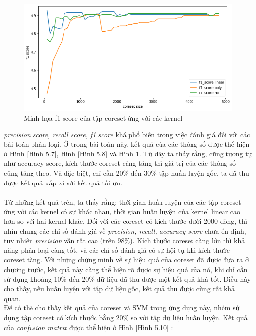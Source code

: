 \documentclass[a4paper, 12pt, oneside]{report}
\begin{document}
\begin{center}
    \begin{figure}[H]
    \begin{center}
     \includegraphics[scale=0.4]{f1_score_creditcard_Fraud.png}
    \end{center}
     \caption{Minh họa f1 score của tập coreset ứng với các kernel}
    \label{Hình 5.9}
    \end{figure}
\end{center}
\textit{precision score, recall score, f1 score} khá phổ biến trong việc đánh giá đối với các bài toán phân loại. Ở trong bài toán này, kết quả của các thông số được thể hiện ở Hình \ref{Hình 5.7}, Hình \ref{Hình 5.8} và Hình \ref{Hình 5.9}. Từ đây ta thấy rằng, cũng tương tự như accuracy score, kích thước coreset càng tăng thì giá trị của các thông số cũng tăng theo. Và đặc biệt, chỉ cần 20\% đến 30\% tập huấn luyện gốc, ta đã thu được kết quả xấp xỉ với kết quả tối ưu.\\ \\
Từ những kết quả trên, ta thấy rằng: thời gian huấn luyện của các tập coreset ứng với các kernel có sự khác nhau, thời gian huấn luyện của kernel linear cao hơn so với hai kernel khác. Đối với các coreset có kích thước dưới 2000 dòng, thì nhìn chung các chỉ số đánh giá về \textit{precision, recall, accuracy score} chưa ổn định, tuy nhiên \textit{precision} vẫn rất cao (trên 98\%). Kích thước coreset càng lớn thì khả năng phân loại càng tốt, và các chỉ số đánh giá có sự hội tụ khi kích thước coreset tăng. Với những chứng minh về sự hiệu quả của coreset đã được đưa ra ở chương trước, kết quả này càng thể hiện rõ được sự hiệu quả của nó, khi chỉ cần sử dụng khoảng 10\% đến 20\% dữ liệu đã thu được một kết quả khá tốt. Điều này cho thấy, nếu huấn luyện với tập dữ liệu gốc, kết quả thu được cùng rất khả quan.\\
Để có thể cho thấy kết quả của coreset và SVM trong ứng dụng này, nhóm sử dụng tập coreset có kích thước bằng 20\% so với tập dữ liệu huấn luyện. Kết quả của \textit{confusion matrix} được thể hiện ở Hình \ref{Hình 5.10} :
\end{document}
